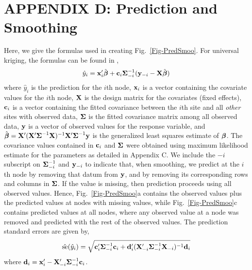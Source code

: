 \documentclass[11pt, titlepage]{article}\usepackage[]{graphicx}\usepackage[]{color}
\renewcommand{\theequation}{eqn \arabic{equation}}
\begin{document}
\clearpage
\setcounter{equation}{0}
\renewcommand{\theequation}{D.\arabic{equation}}
\setcounter{figure}{0}
\renewcommand{\thefigure}{D.\arabic{figure}}
\section{APPENDIX D: Prediction and Smoothing}

Here, we give the formulas used in creating Fig.~\ref{Fig-PredSmoo}.  For universal kriging, the formulas can be found in \citet[][p. 148]{Cres:Wikl:stat:2011},
\[
				\hat{y}_i = \mathbf{x}_i^{\prime}\hat{\mbox{\boldmath $\beta$}} + \mathbf{c}_i\mbox{\boldmath $\Sigma$}^{-1}_{-i}(\mathbf{y}_{-i} - \mathbf{X}\hat{\mbox{\boldmath $\beta$}})
\]
where $\hat{y}_i$ is the prediction for the $i$th node, $\mathbf{x}_i$ is a vector containing the covariate values for the $i$th node, $\mathbf{X}$ is the design matrix for the covariates (fixed effects), $\mathbf{c}_i$ is a vector containing the fitted covariance between the $i$th site and all \emph{other} sites with observed data, $\mbox{\boldmath $\Sigma$}$ is the fitted covariance matrix among all observed data, $\mathbf{y}$ is a vector of observed values for the response variable, and $\hat{\mbox{\boldmath $\beta$}} = \mathbf{X}^{\prime}(\mathbf{X}^{\prime}\mbox{\boldmath $\Sigma$}^{-1}\mathbf{X})^{-1}\mathbf{X}^{\prime}\mbox{\boldmath $\Sigma$}^{-1}\mathbf{y}$ is the generalized least squares estimate of $\mbox{\boldmath $\beta$}$.  The covariance values contained in $\mathbf{c}_i$ and $\mbox{\boldmath $\Sigma$}$ were obtained using maximum likelihood estimate for the parameters as detailed in Appendix C.  We include the $-i$ subscript on $\mbox{\boldmath $\Sigma$}^{-1}_{-i}$ and $\mathbf{y}_{-i}$ to indicate that, when smoothing, we predict at the $i$th node by removing that datum from $\mathbf{y}$, and by removing its corresponding rows and columns in $\mbox{\boldmath $\Sigma$}$.  If the value is missing, then prediction proceeds using all observed values.  Hence, Fig.~\ref{Fig-PredSmoo}a contains the observed values plus the predicted values at nodes with missing values, while Fig.~\ref{Fig-PredSmoo}c contains predicted values at all nodes, where any observed value at a node was removed and predicted with the rest of the observed values.  The prediction standard errors are given by,
\[
	\hat{\textrm{se}}(\hat{y}_i) = \sqrt{\mathbf{c}_i^{\prime}\mbox{\boldmath $\Sigma$}^{-1}_{-i}\mathbf{c}_i + 
	  \mathbf{d}_i^{\prime}(\mathbf{X}_{-i}^{\prime}\mbox{\boldmath $\Sigma$}^{-1}_{-i}\mathbf{X}_{-i})^{-1} \mathbf{d}_i}
\]
where $\mathbf{d}_i = \mathbf{x}_i^{\prime} - \mathbf{X}_{-i}^{\prime}\mbox{\boldmath $\Sigma$}^{-1}_{-i}\mathbf{c}_i$.
\end{document}
